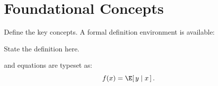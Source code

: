 \section{Foundational Concepts}
\label{sec:learnt-foundations}


Define the key concepts. A formal definition environment is available:

\begin{definition}
  \label{def:key-term}
  State the definition here.
\end{definition}

\noindent and equations are typeset as:
\begin{equation}
  \label{eq:concept}
  f(x) = \E\!\left[\, y \mid x \,\right].
\end{equation}
